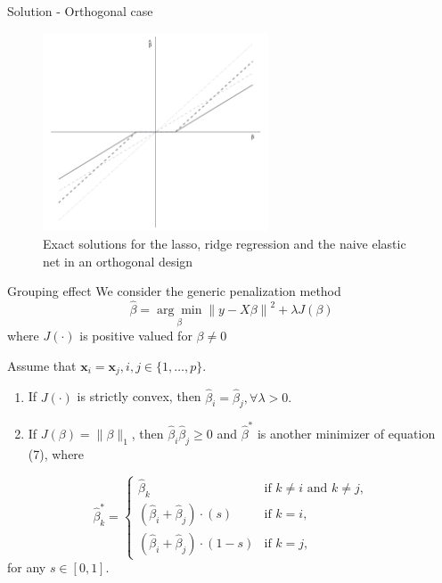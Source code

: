 \begin{frame}{Solution - Orthogonal case}
    \begin{figure}
        \centering
        \includegraphics[width=0.6\textwidth]{img/image2.png}
        \caption{Exact solutions for the lasso, ridge regression and the naive elastic net in an orthogonal design}
        \label{fig:enter-label}
    \end{figure}
\end{frame}

\begin{frame}{Grouping effect}
    We consider the generic penalization method
    \begin{equation}
        \hat{\beta} = \underset{\beta}{\arg\min} \left\lVert y - X\beta \right\rVert^2 + \lambda J(\beta)
    \end{equation}
    where $J(\cdot)$ is positive valued for $\beta \neq 0$
    \begin{lemma}[2]
        Assume that $\textbf{x}_i = \textbf{x}_j, i,j \in \{1, \ldots, p\}.$
        \begin{enumerate}[label=(\alph*)]
  \item If \( J(\cdot) \) is strictly convex, then \( \hat{\beta}_i = \hat{\beta}_j, \forall \lambda > 0. \)
  \item If \( J(\beta) = \lVert \beta \rVert_1 \), then \( \hat{\beta}_i \hat{\beta}_j \geq 0 \) and \( \hat{\beta}^* \) is another minimizer of equation (7), where
\end{enumerate}

\[
\hat{\beta}_k^* = 
\begin{cases} 
\hat{\beta}_k & \text{if } k \neq i \text{ and } k \neq j, \\
(\hat{\beta}_i + \hat{\beta}_j) \cdot (s) & \text{if } k = i, \\
(\hat{\beta}_i + \hat{\beta}_j) \cdot (1 - s) & \text{if } k = j,
\end{cases}
\]
for any \( s \in [0, 1] \).
    \end{lemma}
\end{frame}


